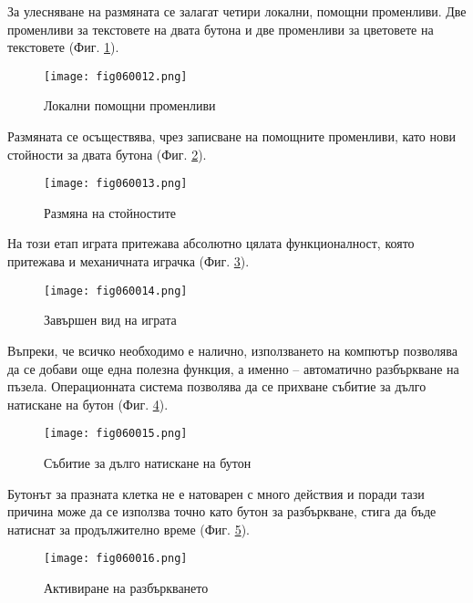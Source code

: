 За улесняване на размяната се залагат четири локални, помощни променливи. Две променливи за текстовете на двата бутона и две променливи за цветовете на текстовете (Фиг. \ref{fig060012}).

\begin{figure}[H]
  \centering
  \texttt{[image: fig060012.png]}
  \caption{Локални помощни променливи}
\label{fig060012}
\end{figure}

Размяната се осъществява, чрез записване на помощните променливи, като нови стойности за двата бутона (Фиг. \ref{fig060013}).

\begin{figure}[H]
  \centering
  \texttt{[image: fig060013.png]}
  \caption{Размяна на стойностите}
\label{fig060013}
\end{figure}

На този етап играта притежава абсолютно цялата функционалност, която притежава и механичната играчка (Фиг. \ref{fig060014}).

\begin{figure}[H]
  \centering
  \texttt{[image: fig060014.png]}
  \caption{Завършен вид на играта}
\label{fig060014}
\end{figure}

Въпреки, че всичко необходимо е налично, използването на компютър позволява да се добави още една полезна функция, а именно – автоматично разбъркване на пъзела. Операционната система позволява да се прихване събитие за дълго натискане на бутон (Фиг. \ref{fig060015}).

\begin{figure}[H]
  \centering
  \texttt{[image: fig060015.png]}
  \caption{Събитие за дълго натискане на бутон}
\label{fig060015}
\end{figure}

Бутонът за празната клетка не е натоварен с много действия и поради тази причина може да се използва точно като бутон за разбъркване, стига да бъде натиснат за продължително време (Фиг. \ref{fig060016}).

\begin{figure}[H]
  \centering
  \texttt{[image: fig060016.png]}
  \caption{Активиране на разбъркването}
\label{fig060016}
\end{figure}

